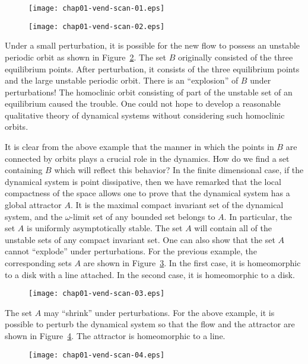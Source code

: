 \documentclass{surv-l}
\theoremstyle{plain}
\theoremstyle{definition}
\numberwithin{equation}{section}
\numberwithin{figure}{chapter}
\begin{document}
\begin{figure}[!h]
\texttt{[image: chap01-vend-scan-01.eps]}
\caption{}
\label{fig1.1}
\end{figure}

\begin{figure}[!h]
\texttt{[image: chap01-vend-scan-02.eps]}
\caption{}
\label{fig1.2}
\end{figure}

Under a small perturbation, it is possible for the new flow to possess an unstable periodic orbit as shown in Figure~\ref{fig1.2}. The set $B$ originally consisted of the three equilibrium points. After perturbation, it consists of the three equilibrium points and the large unstable periodic orbit. There is an ``explosion'' of $B$ under perturbations! The homoclinic orbit consisting of part of the unstable set of an equilibrium caused the trouble. One could not hope to develop a reasonable qualitative theory of dynamical systems without considering such homoclinic orbits.

It is clear from the above example that the manner in which the points in $B$ are connected by orbits plays a crucial role in the dynamics. How do we find a set containing $B$ which will reflect this behavior? In the finite dimensional case, if the dynamical system is point dissipative, then we have remarked that the local compactness of the space allows one to prove that the dynamical system has a global attractor $A$. It is the maximal compact invariant set of the dynamical system, and the $\omega$-limit set of any bounded set belongs to $A$. In particular, the set $A$ is uniformly asymptotically stable. The set $A$ will contain all of the unstable sets of any compact invariant set. One can also show that the set $A$ cannot ``explode'' under perturbations. For the previous example, the corresponding sets $A$ are shown in Figure~\ref{fig1.3}. In the first case, it is homeomorphic to a disk with a line attached. In the second case, it is homeomorphic to a disk.

\begin{figure}[!h]
\texttt{[image: chap01-vend-scan-03.eps]}
\caption{}
\label{fig1.3}
\end{figure}

The set $A$ may ``shrink'' under perturbations. For the above example, it is possible to perturb the dynamical system so that the flow and the attractor are shown in Figure~\ref{fig1.4}. The attractor is homeomorphic to a line.

\begin{figure}[!h]
\texttt{[image: chap01-vend-scan-04.eps]}
\caption{}
\label{fig1.4}
\end{figure}
\end{document}
